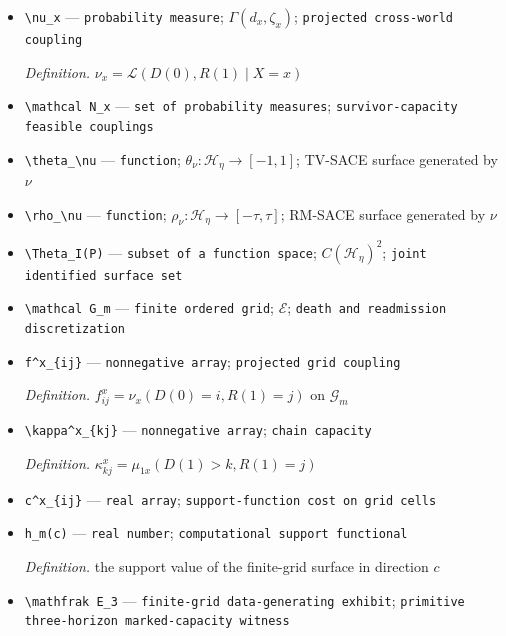 \documentclass{article}
\begin{document}
\begin{itemize}
  \item \texttt{\textbackslash{}\allowbreak{}nu\_\allowbreak{}x} --- \texttt{probability measure}; \(\Gamma(d_x,\zeta_x)\); \texttt{projected cross-\allowbreak{}world coupling}
  \par\smallskip\noindent\emph{Definition.} \(\nu_x=\mathcal L(D(0),R(1)\mid X=x)\)
  \item \texttt{\textbackslash{}\allowbreak{}mathcal N\_\allowbreak{}x} --- \texttt{set of probability measures}; \texttt{survivor-\allowbreak{}capacity feasible couplings}
  \item \texttt{\textbackslash{}\allowbreak{}theta\_\allowbreak{}\textbackslash{}\allowbreak{}nu} --- \texttt{function}; \(\theta_\nu:\mathcal H_\eta\to[-1,1]\); TV-SACE surface generated by \(\nu\)
  \item \texttt{\textbackslash{}\allowbreak{}rho\_\allowbreak{}\textbackslash{}\allowbreak{}nu} --- \texttt{function}; \(\rho_\nu:\mathcal H_\eta\to[-\tau,\tau]\); RM-SACE surface generated by \(\nu\)
  \item \texttt{\textbackslash{}\allowbreak{}Theta\_\allowbreak{}I(P)} --- \texttt{subset of a function space}; \(C(\mathcal H_\eta)^2\); \texttt{joint identified surface set}
  \item \texttt{\textbackslash{}\allowbreak{}mathcal G\_\allowbreak{}m} --- \texttt{finite ordered grid}; \(\mathcal E\); \texttt{death and readmission discretization}
  \item \texttt{f\textasciicircum{}x\_\allowbreak{}\{ij\}\allowbreak{}} --- \texttt{nonnegative array}; \texttt{projected grid coupling}
  \par\smallskip\noindent\emph{Definition.} \(f^x_{ij}=\nu_x(D(0)=i,R(1)=j)\) on \(\mathcal G_m\)
  \item \texttt{\textbackslash{}\allowbreak{}kappa\textasciicircum{}x\_\allowbreak{}\{kj\}\allowbreak{}} --- \texttt{nonnegative array}; \texttt{chain capacity}
  \par\smallskip\noindent\emph{Definition.} \(\kappa^x_{kj}=\mu_{1x}(D(1)>k,R(1)=j)\)
  \item \texttt{c\textasciicircum{}x\_\allowbreak{}\{ij\}\allowbreak{}} --- \texttt{real array}; \texttt{support-\allowbreak{}function cost on grid cells}
  \item \texttt{h\_\allowbreak{}m(c)} --- \texttt{real number}; \texttt{computational support functional}
  \par\smallskip\noindent\emph{Definition.} the support value of the finite-grid surface in direction \(c\)
  \item \texttt{\textbackslash{}\allowbreak{}mathfrak E\_\allowbreak{}3} --- \texttt{finite-\allowbreak{}grid data-\allowbreak{}generating exhibit}; \texttt{primitive three-\allowbreak{}horizon marked-\allowbreak{}capacity witness}

\end{itemize}
\end{document}
